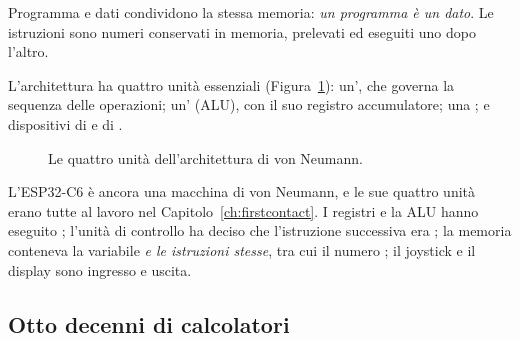 \begin{prgconcept}
Programma e dati condividono la stessa memoria: \emph{un programma è un dato}.
Le istruzioni sono numeri conservati in memoria, prelevati ed eseguiti uno dopo
l'altro.
\end{prgconcept}

L'architettura ha quattro unità essenziali (Figura~\ref{fig:hist:vn}):
un', che governa la sequenza delle operazioni;
un' (ALU), con il suo registro accumulatore; una
; e dispositivi di  e di .

\begin{figure}[htb]
\centering
{}
\caption{Le quattro unità dell'architettura di von Neumann.}
\label{fig:hist:vn}
\end{figure}

\begin{prgmachine}
L'ESP32-C6 è ancora una macchina di von Neumann, e le sue quattro unità erano
tutte al lavoro nel Capitolo~\ref{ch:firstcontact}. I registri e la ALU hanno
eseguito ; l'unità di controllo ha deciso che l'istruzione
successiva era ; la memoria conteneva la variabile 
\emph{e le istruzioni stesse}, tra cui il numero ; il joystick e
il display sono ingresso e uscita.
\end{prgmachine}

\subsection{Otto decenni di calcolatori}


